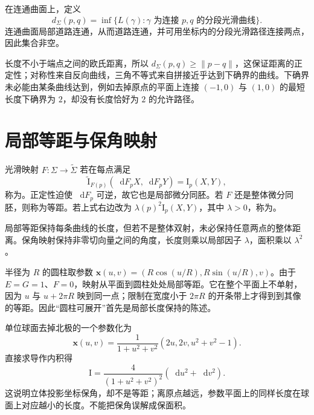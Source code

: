 \documentclass[UTF8,12pt,a4paper,fontset=fandol]{ctexbook}
\newcommand{\dd}{\mathop{}\!\mathrm d}
\newcommand{\norm}[1]{\lVert #1\rVert}
\begin{document}
\begin{definition}[内蕴距离]
在连通曲面上，定义
\[
 d_\Sigma(p,q)=\inf\{L(\gamma):\gamma\text{ 为连接 }p,q\text{ 的分段光滑曲线}\}.
\]
连通曲面局部道路连通，从而道路连通，并可用坐标内的分段光滑路径连接两点，因此集合非空。
\end{definition}
长度不小于端点之间的欧氏距离，所以 $d_\Sigma(p,q)\ge\norm{p-q}$，这保证距离的正定性；对称性来自反向曲线，三角不等式来自拼接近乎达到下确界的曲线。下确界未必能由某条曲线达到，例如去掉原点的平面上连接 $(-1,0)$ 与 $(1,0)$ 的最短长度下确界为 $2$，却没有长度恰好为 $2$ 的允许路径。

\section{局部等距与保角映射}
\begin{definition}[等距与保角]
光滑映射 $F:\Sigma\to\widetilde\Sigma$ 若在每点满足
\[
 \widetilde{\mathrm I}_{F(p)}(\dd F_pX,\dd F_pY)=\mathrm I_p(X,Y),
\]
称为。正定性迫使 $\dd F_p$ 可逆，故它也是局部微分同胚。若 $F$ 还是整体微分同胚，则称为等距。若上式右边改为 $\lambda(p)^2\mathrm I_p(X,Y)$，其中 $\lambda>0$，称为。
\end{definition}
局部等距保持每条曲线的长度，但若不是整体双射，未必保持任意两点的整体距离。保角映射保持非零切向量之间的角度，长度则乘以局部因子 $\lambda$，面积乘以 $\lambda^2$。

\begin{example}[圆柱展开]\label{exam:dg-cylinder-isometry}
半径为 $R$ 的圆柱取参数 $\mathbf x(u,v)=(R\cos(u/R),R\sin(u/R),v)$。由于 $E=G=1$、$F=0$，映射从平面到圆柱处处局部等距。它在整个平面上不单射，因为 $u$ 与 $u+2\pi R$ 映到同一点；限制在宽度小于 $2\pi R$ 的开条带上才得到到其像的等距。因此“圆柱可展开”首先是局部长度保持的陈述。
\end{example}

\begin{example}[球面的立体投影坐标]\label{exam:dg-stereographic}
单位球面去掉北极的一个参数化为
\[
 \mathbf x(u,v)=\frac1{1+u^2+v^2}(2u,2v,u^2+v^2-1).
\]
直接求导作内积得
\begin{equation}
 \mathrm I=\frac4{(1+u^2+v^2)^2}(\dd u^2+\dd v^2).
 \label{eq:dg-stereo-metric}
\end{equation}
这说明立体投影坐标保角，却不是等距；离原点越远，参数平面上的同样长度在球面上对应越小的长度。不能把保角误解成保面积。
\end{example}
\end{document}
